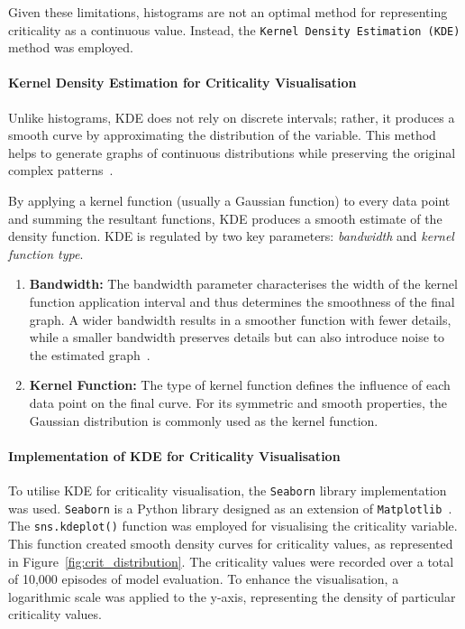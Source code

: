 Given these limitations, histograms are not an optimal method for representing criticality as a continuous value. Instead, the \texttt{Kernel Density Estimation (KDE)} method was employed.

\paragraph{Kernel Density Estimation for Criticality Visualisation}

Unlike histograms, KDE does not rely on discrete intervals; rather, it produces a smooth curve by approximating the distribution of the variable. This method helps to generate graphs of continuous distributions while preserving the original complex patterns~\cite{kde2018}.

By applying a kernel function (usually a Gaussian function) to every data point and summing the resultant functions, KDE produces a smooth estimate of the density function. KDE is regulated by two key parameters: \textit{bandwidth} and \textit{kernel function type}.

\begin{enumerate}
    \item \textbf{Bandwidth:} The bandwidth parameter characterises the width of the kernel function application interval and thus determines the smoothness of the final graph. A wider bandwidth results in a smoother function with fewer details, while a smaller bandwidth preserves details but can also introduce noise to the estimated graph~\cite{chen2017tutorialkerneldensityestimation}.

    \item \textbf{Kernel Function:} The type of kernel function defines the influence of each data point on the final curve. For its symmetric and smooth properties, the Gaussian distribution is commonly used as the kernel function.
\end{enumerate}

\paragraph{Implementation of KDE for Criticality Visualisation}

To utilise KDE for criticality visualisation, the \texttt{Seaborn} library implementation was used. \texttt{Seaborn} is a Python library designed as an extension of \texttt{Matplotlib}~\cite{seaborn2021}. The \texttt{sns.kdeplot()} function was employed for visualising the criticality variable. This function created smooth density curves for criticality values, as represented in Figure~\ref{fig:crit_distribution}. The criticality values were recorded over a total of 10,000 episodes of model evaluation. To enhance the visualisation, a logarithmic scale was applied to the y-axis, representing the density of particular criticality values.

